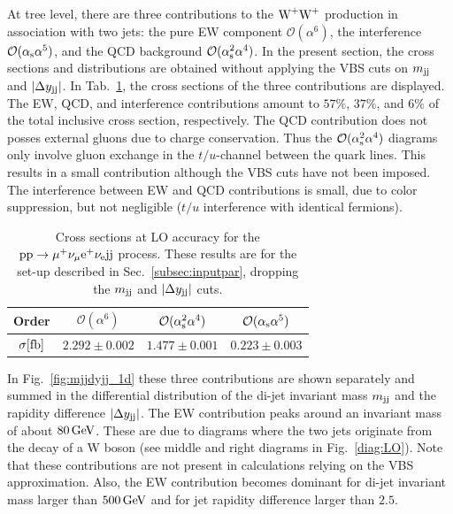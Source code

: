 At tree level, there are three contributions to the $\text{W}^+\text{W}^+$ production in association with two jets: the pure EW component $\mathcal{O}(\alpha^6)$, the interference $\mathcal{O}(\alpha_\text{s}\alpha^5)$, and the QCD background $\mathcal{O}(\alpha_\text{s}^2\alpha^4)$.
In the present section, the cross sections and distributions are obtained without applying the VBS cuts on $m_{\text{j}\text{j}}$ and $|\Delta y_{\text{j}\text{j}}|$.
In Tab.~\ref{tab:LOscanXsec}, the cross sections of the three contributions are displayed.
The EW, QCD, and interference contributions amount to $57\%$, $37\%$, and $6\%$ of the total inclusive cross section, respectively.
The QCD contribution does not posses external gluons due to charge conservation.
Thus the $\mathcal{O}(\alpha_\text{s}^2\alpha^4)$ diagrams only involve gluon exchange in the $t/u$-channel between the quark lines.
This results in a small contribution although the VBS cuts have not been imposed.
The interference between EW and QCD contributions is small, due to color suppression, but not negligible ($t/u$ interference with identical fermions).

\begin{table}[h!]
    \centering
    \begin{tabular}{c|c|c|c}
        Order & $ \mathcal{O}(\alpha^6)$ & $\mathcal{O}(\alpha_\text{s}^2\alpha^4)$ & $\mathcal{O}(\alpha_\text{s}\alpha^5)$ \\
        \hline
        \hline
        $\sigma[\rm{fb}]$ & $ 2.292 \pm 0.002 $ & $ 1.477 \pm 0.001 $ & $ 0.223 \pm 0.003 $ \\
    \end{tabular}
    \caption{\label{tab:LOscanXsec} Cross sections at LO accuracy for the ${\rm p}{\rm p}\to\mu^+\nu_\mu{\rm e}^+\nu_{\rm e}{\rm j}{\rm j}$ process.
    These results are for the set-up described in Sec.~\ref{subsec:inputpar}, dropping the $m_{\text{j}\text{j}}$ and $|\Delta y_{\text{j}\text{j}}|$ cuts.}
\end{table}

In Fig.~\ref{fig:mjjdyjj_1d} these three contributions are shown separately and summed in the differential distribution of the di-jet invariant mass $m_{\text{j}\text{j}}$ and the rapidity difference $|\Delta y_{\text{j}\text{j}}|$.
The EW contribution peaks around an invariant mass of about $80\,\text{GeV}$.
These are due to diagrams where the two jets originate from the decay of a W boson (see middle and right diagrams in Fig.~\ref{diag:LO}).
Note that these contributions are not present in calculations relying on the VBS approximation.
Also, the EW contribution becomes dominant for di-jet invariant mass larger than $500\,\text{GeV}$ and for jet rapidity difference larger than $2.5$.

